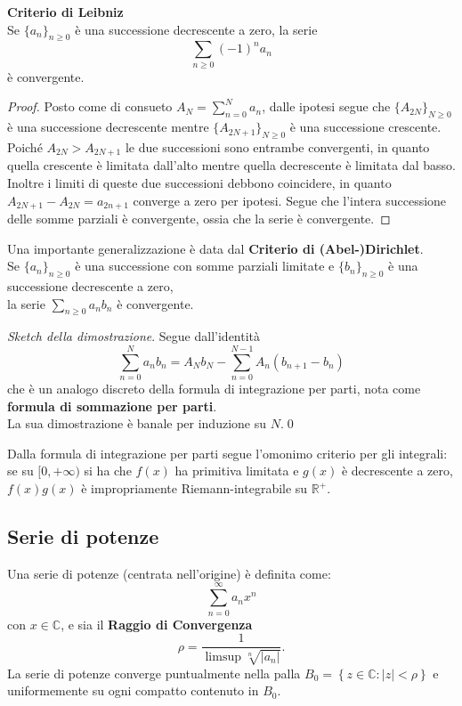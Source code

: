 \documentclass[a4paper,twoside]{article}
\newcommand{\C}{\mathbb{C}}
\newcommand{\R}{\mathbb{R}}
\theoremstyle{definition}
\numberwithin{theorem}{section}
\begin{document}
\textbf{Criterio di Leibniz}\\
Se $\{a_n\}_{n\geq 0}$ è una successione decrescente a zero, la serie
$$ \sum_{n\geq 0} (-1)^n a_n $$
è convergente.\\
\begin{proof} Posto come di consueto $A_N=\sum_{n=0}^{N}a_n$, dalle ipotesi segue che $\{A_{2N}\}_{N\geq 0}$ è una successione decrescente mentre $\{A_{2N+1}\}_{N\geq 0}$ è una successione crescente. Poiché $A_{2N} > A_{2N+1}$ le due successioni sono entrambe convergenti, in quanto quella crescente è limitata dall'alto mentre quella decrescente è limitata dal basso. Inoltre i limiti di queste due successioni debbono coincidere, in quanto $A_{2N+1}-A_{2N}=a_{2n+1}$ converge a zero per ipotesi. Segue che l'intera successione delle somme parziali è convergente, ossia che la serie è convergente. 
\end{proof}


Una importante generalizzazione è data dal \textbf{Criterio di (Abel-)Dirichlet}.\\
Se $\{a_n\}_{n\geq 0}$ è una successione con somme parziali limitate e $\{b_n\}_{n\geq 0}$ è una successione decrescente a zero,\\ la serie $\sum_{n\geq 0}a_n b_n$ è convergente.

\emph{Sketch della dimostrazione}. Segue dall'identità
$$ \sum_{n=0}^{N}a_n b_n = A_N b_N - \sum_{n=0}^{N-1} A_n (b_{n+1}-b_n) $$
che è un analogo discreto della formula di integrazione per parti, nota come \textbf{formula di sommazione per parti}.\\ La sua dimostrazione è banale per induzione su $N$.\qed

Dalla formula di integrazione per parti segue l'omonimo criterio per gli integrali: se su $[0,+\infty)$ si ha che $f(x)$ ha primitiva limitata e $g(x)$ è decrescente a zero, $f(x)g(x)$ è impropriamente Riemann-integrabile su $\R^+$.

\subsection{Serie di potenze}
Una serie di potenze (centrata nell'origine) è definita come:
$$\sum_{n=0}^{\infty}a_n x^n$$
con $x\in\C$, e sia il \textbf{Raggio di Convergenza} \\
$$\rho=\frac{1}{\limsup\sqrt[n]{|a_n|}}.$$
La serie di potenze converge puntualmente nella palla $B_0=\left\{z\in\C : |z|< \rho \right\}$ e uniformemente su ogni compatto contenuto in $B_0$.
\end{document}
